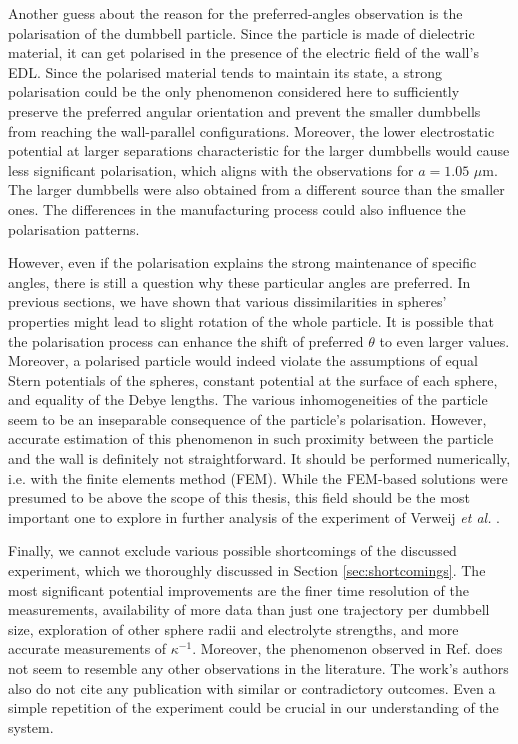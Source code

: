 \documentclass{master_thesis}
\begin{document}
Another guess about the reason for the preferred-angles observation is the polarisation of the dumbbell particle. Since the particle is made of dielectric material, it can get polarised in the presence of the electric field of the wall's EDL. Since the polarised material tends to maintain its state, a strong polarisation could be the only phenomenon considered here to sufficiently preserve the preferred angular orientation and prevent the smaller dumbbells from reaching the wall-parallel configurations. Moreover, the lower electrostatic potential at larger separations characteristic for the larger dumbbells would cause less significant polarisation, which aligns with the observations for $a=1.05$ $\mu$m. The larger dumbbells were also obtained from a different source than the smaller ones. The differences in the manufacturing process could also influence the polarisation patterns.

However, even if the polarisation explains the strong maintenance of specific angles, there is still a question why these particular angles are preferred. In previous sections, we have shown that various dissimilarities in spheres' properties might lead to slight rotation of the whole particle. It is possible that the polarisation process can enhance the shift of preferred $\theta$ to even larger values. Moreover, a polarised particle would indeed violate the assumptions of equal Stern potentials of the spheres, constant potential at the surface of each sphere, and equality of the Debye lengths. The various inhomogeneities of the particle seem to be an inseparable consequence of the particle's polarisation. However, accurate estimation of this phenomenon in such proximity between the particle and the wall is definitely not straightforward. It should be performed numerically, i.e. with the finite elements method (FEM). While the FEM-based solutions were presumed to be above the scope of this thesis, this field should be the most important one to explore in further analysis of the experiment of Verweij \textit{et al.} \cite{verweij2021}.

Finally, we cannot exclude various possible shortcomings of the discussed experiment, which we thoroughly discussed in Section \ref{sec:shortcomings}. The most significant potential improvements are the finer time resolution of the measurements, availability of more data than just one trajectory per dumbbell size, exploration of other sphere radii and electrolyte strengths, and more accurate measurements of $\kappa^{-1}$. Moreover, the phenomenon observed in Ref. \cite{verweij2021} does not seem to resemble any other observations in the literature. The work's authors also do not cite any publication with similar or contradictory outcomes. Even a simple repetition of the experiment could be crucial in our understanding of the system.
\end{document}
